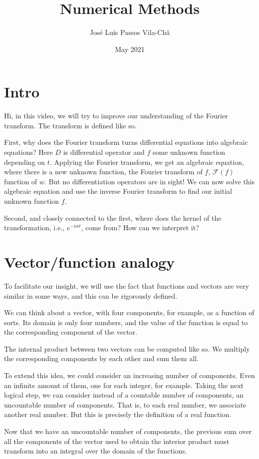 \documentclass{article}
\title{Numerical Methods}
\author{José Luís Passos Vila-Chã}
\date{May 2021}
\begin{document}
\section{Intro}

Hi, in this video, we will try to improve our understanding of the Fourier transform.
The transform is defined like so.



First, why does the Fourier transform turns differential equations into algebraic equations?
Here $D$ is differential operator and $f$ some unknown function depending on $t$.
Applying the Fourier transform, we get an algebraic equation, where there is a new unknown function, the Fourier transform of $f$,
$\mathcal F(f)$ function of $w$.
But no differentiation operators are in sight!
We can now solve this algebraic equation and use the inverse Fourier transform to find our initial unknown function $f$.

Second, and closely connected to the first, where does the kernel of the transformation, i.e., $e^{-iwt}$, come from?
How can we interpret it?

\section{Vector/function analogy}

To facilitate our insight, we will use the fact that functions and vectors are very similar in some ways, and this can be rigorously defined.

We can think about a vector, with four components, for example, as a function of sorts.
Its domain is only four numbers, and the value of the function is equal to the corresponding component of the vector.

The internal product between two vectors can be computed like so.
We multiply the corresponding components by each other and sum them all.

To extend this idea, we could consider an increasing number of components.
Even an infinite amount of them, one for each integer, for example.
Taking the next logical step, we can consider instead of a countable number of components, an uncountable number of components.
That is, to each real number, we associate another real number.
But this is precisely the definition of a real function.

Now that we have an uncountable number of components, the previous sum over all the components of the vector used to obtain the interior product must transform into an integral over the domain of the functions.
\end{document}

